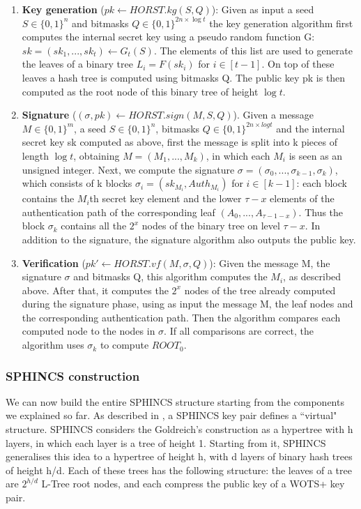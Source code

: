 \documentclass[a4paper,12pt]{article}
\begin{document}
\begin{enumerate}
	\item \textbf{Key generation} ($pk \gets HORST.kg(S, Q)$): Given as input a seed $S \in \{0, 1\}^{n}$ and bitmasks $ Q \in \{0, 1\}^{2n \times \log t}$ the key generation algorithm first computes the internal secret key using a pseudo random function G: $sk = (sk_{1} , . . . , sk_{t} ) \gets G_{t}(S)$. The elements of this list are used to generate the leaves of a binary tree $L_{i} = F(sk_{i})$ for $i \in [t - 1]$.
	On top of these leaves a hash tree is computed using bitmasks Q. The public key pk is then computed as the root node of this binary tree of height $\log t$.
	\item \textbf{Signature} ($(\sigma, pk) \gets HORST.sign(M, S, Q)$). Given a message $M \in \{0, 1\}^{m}$, a seed $S \in \{0, 1\}^{n}$, bitmasks $Q \in \{0, 1\}^{2n \times log t}$ and the internal secret key sk computed as above, first the message is split into k pieces of length $\log t$, obtaining $M = (M_{1} , . . . , M_{k} )$, in which each $M_{i}$ is seen as an unsigned integer.
	Next, we compute the signature $\sigma = (\sigma_{0} , . . . , \sigma_{k-1} ,\sigma_{k})$, which consists of k blocks $\sigma_{i} = (sk_{M_{i}}, Auth_{M_{i}})$ for $i \in [k -1]$: each block contains the $M_{i}$th secret key element and the lower $\tau - x$ elements of the authentication path of the corresponding leaf $(A_{0} , . . . , A_{\tau - 1 - x})$. Thus the block $\sigma_{k}$ contains all the $2^{x}$ nodes of the binary tree on level $\tau - x$. In addition to the signature, the signature algorithm also outputs the public key.
	\item \textbf{Verification} ($pk' \gets HORST.vf(M, \sigma, Q)$): Given the message M, the signature $\sigma$ and bitmasks Q, this algorithm computes the $M_{i}$, as described above. After that, it computes the $2^{x}$ nodes of the tree already computed during the signature phase, using as input the message M, the leaf nodes and the corresponding authentication path. Then the algorithm compares each computed node to the nodes in $\sigma$. If all comparisons are correct, the algorithm uses $\sigma_{k}$ to compute $ROOT_{0}$.
\end{enumerate}

\subsubsection{SPHINCS construction}
\label{subsub:sphincs_construction}

We can now build the entire SPHINCS structure starting from the components we explained so far.
As described in \cite{1_sphincspaper}, a SPHINCS key pair defines a ``virtual" structure. SPHINCS considers the Goldreich's construction as a hypertree with h layers, in which each layer is a tree of height 1. Starting from it, SPHINCS generalises this idea to a hypertree of height h, with d layers of binary hash trees of height h/d. Each of these trees has the following structure: the leaves of a tree are $2^{h/d}$ L-Tree root nodes, and each compress the public key of a WOTS+ key pair. 
\end{document}
